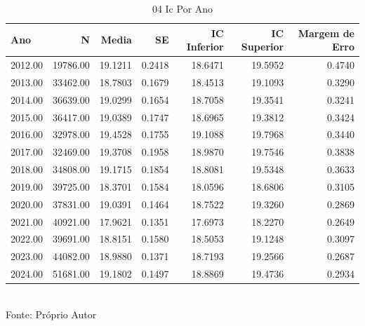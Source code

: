 \begin{table}[H]
\centering
\small
\caption{04 Ic Por Ano}
\label{tab:05_04_Intervalos_Confianca}
\begin{tabular}{|l|r|r|r|r|r|r|}
\hline
\textbf{Ano} & \textbf{N} & \textbf{Media} & \textbf{SE} & \textbf{IC Inferior} & \textbf{IC Superior} & \textbf{Margem de Erro} \\
\hline
2012.00 & 19786.00 & 19.1211 & 0.2418 & 18.6471 & 19.5952 & 0.4740 \\
2013.00 & 33462.00 & 18.7803 & 0.1679 & 18.4513 & 19.1093 & 0.3290 \\
2014.00 & 36639.00 & 19.0299 & 0.1654 & 18.7058 & 19.3541 & 0.3241 \\
2015.00 & 36417.00 & 19.0389 & 0.1747 & 18.6965 & 19.3812 & 0.3424 \\
2016.00 & 32978.00 & 19.4528 & 0.1755 & 19.1088 & 19.7968 & 0.3440 \\
2017.00 & 32469.00 & 19.3708 & 0.1958 & 18.9870 & 19.7546 & 0.3838 \\
2018.00 & 34808.00 & 19.1715 & 0.1854 & 18.8081 & 19.5348 & 0.3633 \\
2019.00 & 39725.00 & 18.3701 & 0.1584 & 18.0596 & 18.6806 & 0.3105 \\
2020.00 & 37831.00 & 19.0391 & 0.1464 & 18.7522 & 19.3260 & 0.2869 \\
2021.00 & 40921.00 & 17.9621 & 0.1351 & 17.6973 & 18.2270 & 0.2649 \\
2022.00 & 39691.00 & 18.8151 & 0.1580 & 18.5053 & 19.1248 & 0.3097 \\
2023.00 & 44082.00 & 18.9880 & 0.1371 & 18.7193 & 19.2566 & 0.2687 \\
2024.00 & 51681.00 & 19.1802 & 0.1497 & 18.8869 & 19.4736 & 0.2934 \\
\hline
\end{tabular}
\\ \small Fonte: Próprio Autor
\end{table}
